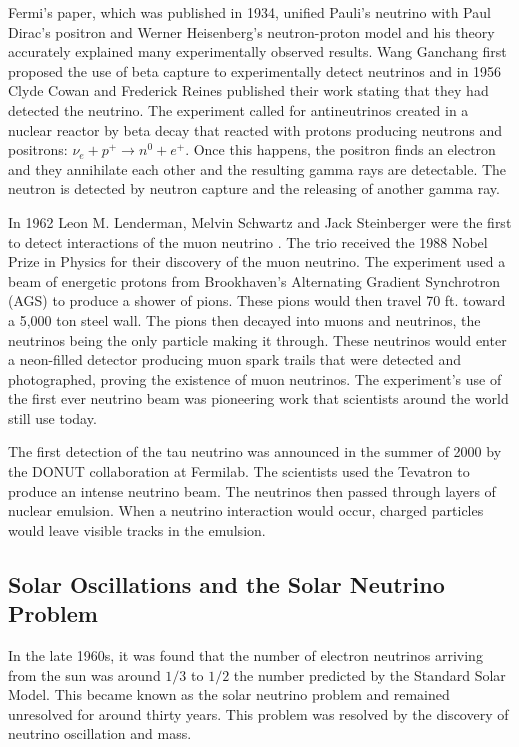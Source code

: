 Fermi's paper, which was published in 1934, unified Pauli's neutrino with Paul Dirac's positron and Werner Heisenberg's neutron-proton model and his theory accurately explained many experimentally observed results. Wang Ganchang first proposed the use of beta capture to experimentally detect neutrinos and in 1956 Clyde Cowan and Frederick Reines published their work stating that they had detected the neutrino. The experiment called for antineutrinos created in a nuclear reactor by beta decay that reacted with protons producing neutrons and positrons: $\nu_{e} +p^{+}\rightarrow n^{0} + e^{+}$. Once this happens, the positron finds an electron and they annihilate each other and the resulting gamma rays are detectable. The neutron is detected by neutron capture and the releasing of another gamma ray. 

In 1962 Leon M. Lenderman, Melvin Schwartz and Jack Steinberger were the first to detect interactions of the muon neutrino \cite{leonlederman}. The trio received the 1988 Nobel Prize in Physics for their discovery of the muon neutrino. The experiment used a beam of energetic protons from Brookhaven's Alternating Gradient Synchrotron (AGS) to produce a shower of pions. These pions would then travel 70 ft. toward a 5,000 ton steel wall. The pions then decayed into muons and neutrinos, the neutrinos being the only particle making it through. These neutrinos would enter a neon-filled detector producing muon spark trails that were detected and photographed, proving the existence of muon neutrinos. The experiment's use of the first ever neutrino beam was pioneering work that scientists around the world still use today.  

The first detection of the tau neutrino was announced in the summer of 2000 by the DONUT collaboration at Fermilab. The scientists used the Tevatron to produce an intense neutrino beam. The neutrinos then passed through layers of nuclear emulsion. When a neutrino interaction would occur, charged particles would leave visible tracks in the emulsion. 

\subsection{Solar Oscillations and the Solar Neutrino Problem}

In the late 1960s, it was found that the number of electron neutrinos arriving from the sun was around $1/3$ to $1/2$ the number predicted by the Standard Solar Model. This became known as the solar neutrino problem and remained unresolved for around thirty years. This problem was resolved by the discovery of neutrino oscillation and mass.\cite{neutrino}

